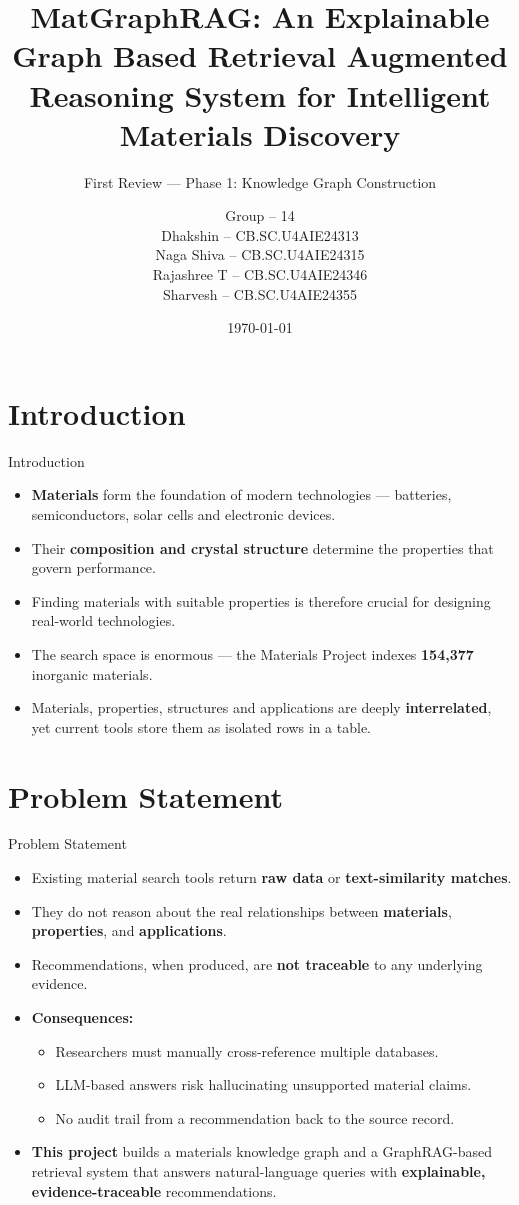 \documentclass{beamer}
\title[MatGraphRAG]
{MatGraphRAG: An Explainable Graph Based Retrieval Augmented Reasoning System for Intelligent Materials Discovery}
\subtitle{First Review --- Phase 1: Knowledge Graph Construction}
\author[Group 14]
{
Group -- 14\\
Dhakshin -- CB.SC.U4AIE24313\\
Naga Shiva -- CB.SC.U4AIE24315\\
Rajashree T -- CB.SC.U4AIE24346\\
Sharvesh -- CB.SC.U4AIE24355
}
\institute[Amrita Vishwa Vidyapeetham]
{
Amrita School of Artificial Intelligence, Amrita Vishwa Vidyapeetham, Coimbatore
}
\date{\today}
\begin{document}
\begin{frame}
  \titlepage
\end{frame}

\section{Introduction}
\begin{frame}{Introduction}
    \begin{itemize}
        \item \textbf{Materials} form the foundation of modern technologies --- batteries, semiconductors, solar cells and electronic devices.
        \item Their \textbf{composition and crystal structure} determine the properties that govern performance.
        \item Finding materials with suitable properties is therefore crucial for designing real-world technologies.
        \item The search space is enormous --- the Materials Project indexes \textbf{154,377} inorganic materials.
        \item Materials, properties, structures and applications are deeply \textbf{interrelated}, yet current tools store them as isolated rows in a table.
    \end{itemize}
\end{frame}

\section{Problem Statement}
\begin{frame}{Problem Statement}
    \begin{itemize}
        \item Existing material search tools return \textbf{raw data} or \textbf{text-similarity matches}.
        \item They do not reason about the real relationships between \textbf{materials}, \textbf{properties}, and \textbf{applications}.
        \item Recommendations, when produced, are \textbf{not traceable} to any underlying evidence.
        \item \textbf{Consequences:}
        \begin{itemize}
            \item Researchers must manually cross-reference multiple databases.
            \item LLM-based answers risk hallucinating unsupported material claims.
            \item No audit trail from a recommendation back to the source record.
        \end{itemize}
        \item \textbf{This project} builds a materials knowledge graph and a GraphRAG-based retrieval system that answers natural-language queries with \textbf{explainable, evidence-traceable} recommendations.
    \end{itemize}
\end{frame}
\end{document}
